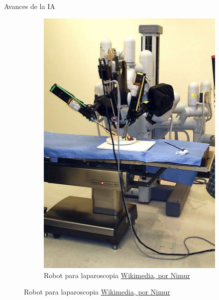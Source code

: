 \begin{frame}[fragile]{Avances de la IA}
\begin{figure}
\begin{subfigure}{0.45\textwidth}
		\includegraphics[scale=0.07]{./EtapaModerna/Imagenes/robot_surgery.jpg}
		\caption{Robot para laparoscopia \href{https://es.m.wikipedia.org/wiki/Archivo:Laproscopic_Surgery_Robot.jpg}{Wikimedia, por Nimur}}
	\end{subfigure}
\end{figure}
\end{frame}


